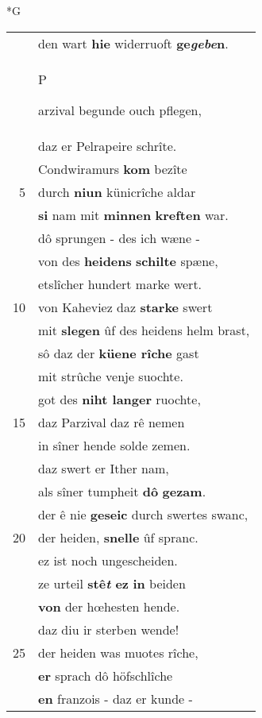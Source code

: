 \documentclass[8pt,a4paper,notitlepage]{article}
\begin{document}
\newpage
\begin{table}[ht]
\begin{minipage}[t]{0.5\linewidth}
\small
\begin{center}*G
\end{center}
\begin{tabular}{rl}
 & den wart \textbf{hie} widerruoft \textbf{ge\textit{gebe}n}.\\ 
 & \begin{large}P\end{large}arzival begunde ouch pflegen,\\ 
 & daz er Pelrapeire schrîte.\\ 
 & Condwiramurs \textbf{kom} bezîte\\ 
5 & durch \textbf{niun} künicrîche aldar\\ 
 & \textbf{si} nam mit \textbf{minnen} \textbf{kreften} war.\\ 
 & dô sprungen - des ich wæne -\\ 
 & von des \textbf{heidens} \textbf{schilte} spæne,\\ 
 & etslîcher hundert marke wert.\\ 
10 & von Kaheviez daz \textbf{starke} swert\\ 
 & mit \textbf{slegen} ûf des heidens helm brast,\\ 
 & sô daz der \textbf{küene rîche} gast\\ 
 & mit strûche venje suochte.\\ 
 & got des \textbf{niht langer} ruochte,\\ 
15 & daz Parzival daz rê nemen\\ 
 & in sîner hende solde zemen.\\ 
 & daz swert er Ither nam,\\ 
 & als sîner tumpheit \textbf{dô} \textbf{gezam}.\\ 
 & der ê nie \textbf{geseic} durch swertes swanc,\\ 
20 & der heiden, \textbf{snelle} ûf spranc.\\ 
 & ez ist noch ungescheiden.\\ 
 & ze urteil \textbf{stê\textit{t} ez} \textbf{in} beiden\\ 
 & \textbf{von} der hœhesten hende.\\ 
 & daz diu ir sterben wende!\\ 
25 & der heiden was muotes rîche,\\ 
 & \textbf{er} sprach dô höfschlîche\\ 
 & \textbf{en} franzois - daz er kunde -\\ 

\end{tabular}
\end{minipage}
\end{table}
\end{document}
